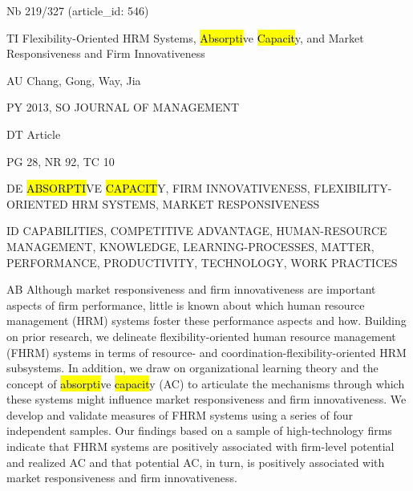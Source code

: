 \documentclass[a4paper]{article}
\begin{document}
\vspace*{-2cm}
Nb \tabto{0cm}219/327 (article\_id: 546)\par
TI \tabto{0cm}Flexibility-Oriented HRM Systems, \hl{Absorpti}ve \hl{Capacit}y, and Market Responsiveness and Firm Innovativeness\par
AU \tabto{0cm}Chang, Gong, Way, Jia\par
PY \tabto{0cm}2013, SO JOURNAL OF MANAGEMENT\par
DT \tabto{0cm}Article\par
PG \tabto{0cm}28, NR 92, TC 10\par
DE \tabto{0cm}\hl{ABSORPTI}VE \hl{CAPACIT}Y, FIRM INNOVATIVENESS, FLEXIBILITY-ORIENTED HRM SYSTEMS, MARKET RESPONSIVENESS\par
ID \tabto{0cm}CAPABILITIES, COMPETITIVE ADVANTAGE, HUMAN-RESOURCE MANAGEMENT, KNOWLEDGE, LEARNING-PROCESSES, MATTER, PERFORMANCE, PRODUCTIVITY, TECHNOLOGY, WORK PRACTICES\par
AB \tabto{0cm}Although market responsiveness and firm innovativeness are important aspects of firm performance, little is known about which human resource management (HRM) systems foster these performance aspects and how. Building on prior research, we delineate flexibility-oriented human resource management (FHRM) systems in terms of resource- and coordination-flexibility-oriented HRM subsystems. In addition, we draw on organizational learning theory and the concept of \hl{absorpti}ve \hl{capacit}y (AC) to articulate the mechanisms through which these systems might influence market responsiveness and firm innovativeness. We develop and validate measures of FHRM systems using a series of four independent samples. Our findings based on a sample of high-technology firms indicate that FHRM systems are positively associated with firm-level potential and realized AC and that potential AC, in turn, is positively associated with market responsiveness and firm innovativeness.\par
\clearpage
\end{document}
